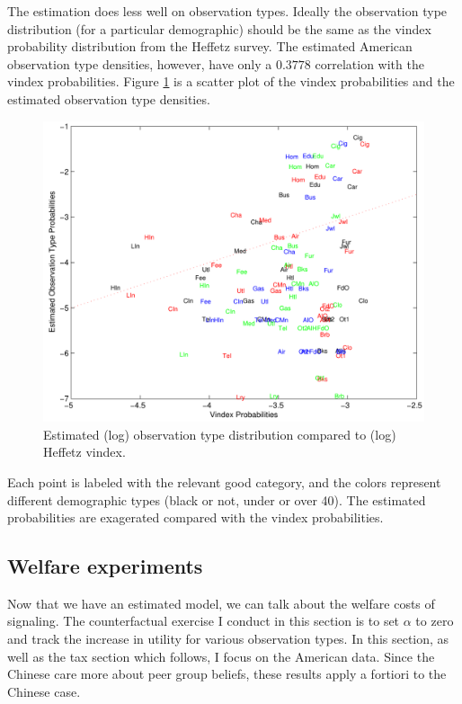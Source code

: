 \documentclass[12pt]{article}
\begin{document}
The estimation does less well on observation types.
Ideally the observation type distribution (for a particular demographic) should be the same as the vindex probability distribution from the Heffetz survey.
The estimated American observation type densities, however, have only a $0.3778$ correlation with the vindex probabilities.
Figure \ref{fig:vinmatch} is a scatter plot of the vindex probabilities and the estimated observation type densities.
\begin{figure}
    \begin{center}
	\includegraphics[scale=.8]{pics/vinmatch_cropped.pdf}
    \end{center}
    \caption{Estimated (log) observation type distribution compared to (log) Heffetz vindex.}
    \label{fig:vinmatch}
\end{figure}
Each point is labeled with the relevant good category, and the colors represent different demographic types (black or not, under or over 40).
The estimated probabilities are exagerated compared with the vindex probabilities.

\subsection{Welfare experiments}
Now that we have an estimated model, we can talk about the welfare costs of signaling.
The counterfactual exercise I conduct in this section is to set $\alpha$ to zero and track the increase in utility for various observation types.
In this section, as well as the tax section which follows, I focus on the American data.  Since the Chinese care more about peer group beliefs, these results apply a fortiori to the Chinese case.
\end{document}

